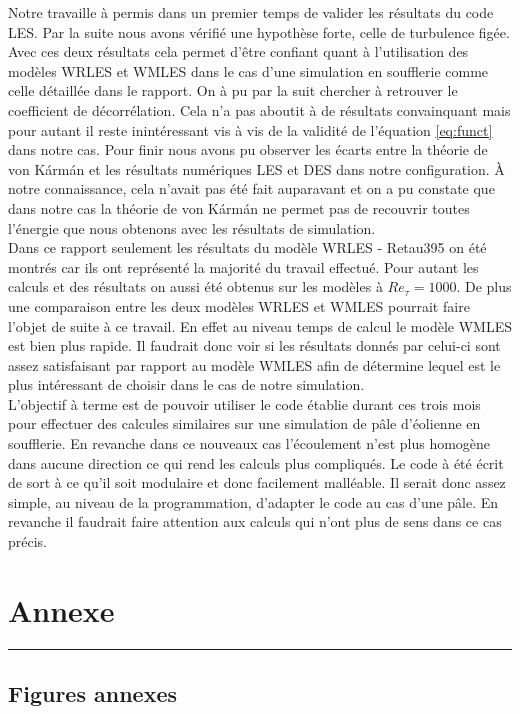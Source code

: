 \documentclass[12pt]{article}
\theoremstyle{plain}
\theoremstyle{remark}
\begin{document}
Notre travaille à permis dans un premier temps de valider les résultats du code LES. Par la suite nous avons vérifié une hypothèse forte, celle de turbulence figée. Avec ces deux résultats cela permet d'être confiant quant à l'utilisation des modèles WRLES et WMLES dans le cas d'une simulation en soufflerie comme celle détaillée dans le rapport. On à pu par la suit chercher à retrouver le coefficient de décorrélation. Cela n'a pas aboutit à de résultats convainquant mais pour autant il reste inintéressant vis à vis de la validité de l'équation \ref{eq:funct} dans notre cas. Pour finir nous avons pu observer les écarts entre la théorie de von Kármán et les résultats numériques LES et DES dans notre configuration. À notre connaissance, cela n'avait pas été fait auparavant et on a pu constate que dans notre cas la théorie de von Kármán ne permet pas de recouvrir toutes l'énergie que nous obtenons avec les résultats de simulation. \\ 
Dans ce rapport seulement les résultats du modèle WRLES - Retau395 on été montrés car ils ont représenté la majorité du travail effectué. Pour autant les calculs et des résultats on aussi été obtenus sur les modèles à $Re_{\tau}=1000$. De plus une comparaison entre les deux modèles WRLES et WMLES pourrait faire l'objet de suite à ce travail. En effet au niveau temps de calcul le modèle WMLES est bien plus rapide. Il faudrait donc voir si les résultats donnés par celui-ci sont assez satisfaisant par rapport au modèle WMLES afin de détermine lequel est le plus intéressant de choisir dans le cas de notre simulation. \\
L'objectif à terme est de pouvoir utiliser le code établie durant ces trois mois pour effectuer des calcules similaires sur une simulation de pâle d'éolienne en soufflerie. En revanche dans ce nouveaux cas l'écoulement n'est plus homogène dans aucune direction ce qui rend les calculs plus compliqués. Le code à été écrit de sort à ce qu'il soit modulaire et donc facilement malléable. Il serait donc assez simple, au niveau de la programmation, d'adapter le code au cas d'une pâle. En revanche il faudrait faire attention aux calculs qui n'ont plus de sens dans ce cas précis.

\pagebreak

\section{Annexe}
\noindent\rule{\linewidth}{2pt}
\vspace{0.1cm}
\subsection{Figures annexes}
\end{document}
